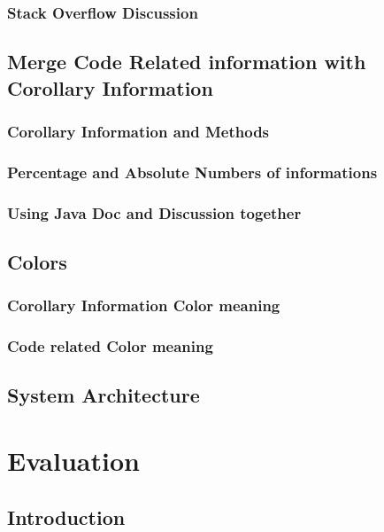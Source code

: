 \documentclass[]{usiinfbachelorproject}
\begin{document}
\subsubsection{Stack Overflow  Discussion}





\subsection{Merge Code Related information with Corollary Information}

\subsubsection{Corollary Information and  Methods}

\subsubsection{Percentage and Absolute Numbers of informations}

\subsubsection{Using Java Doc and Discussion together}


\subsection{Colors}

\subsubsection{Corollary Information Color meaning}

\subsubsection{Code related Color meaning}

\subsection{System Architecture }


\section{Evaluation} \label{evaluation}

\subsection{Introduction}
\end{document}
